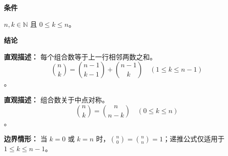 \begin{statementbox}
	\textbf{\textcolor{CStatement}{条件}}
	\begin{description}[style=nextline, leftmargin=2.8em, labelsep=0.5em, itemsep=0.35em]
		\item[\textbf{\textcolor{CStatement}{条件1（定义域范围）：}}]
			$n,k\in\mathbb{N}$ 且 $0\le k\le n$。
	\end{description}
	\textbf{\textcolor{CStatement}{结论}}
	\begin{description}[style=nextline, leftmargin=2.8em, labelsep=0.5em, itemsep=0.45em]
		\item[\textbf{\textcolor{CStatement}{结论一（杨辉递推）：}}]
			\textbf{\textcolor{CStatement}{直观描述：}}
			每个组合数等于上一行相邻两数之和。
			\[
				\binom{n}{k}=\binom{n-1}{k-1}+\binom{n-1}{k}\quad (1\le k\le n-1)
			\]
			。
		\item[\textbf{\textcolor{CStatement}{推广结论（对称性质）：}}]
			\textbf{\textcolor{CStatement}{直观描述：}}
			组合数关于中点对称。
			\[
				\binom{n}{k}=\binom{n}{n-k}\quad (0\le k\le n)
			\]
			。
	\end{description}

	\medskip
	\textbf{\textcolor{CStatement}{边界情形：}}
	当 $k=0$ 或 $k=n$ 时，$\binom{n}{0}=\binom{n}{n}=1$；递推公式仅适用于 $1\le k\le n-1$。
\end{statementbox}
